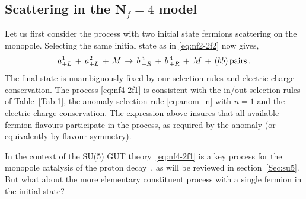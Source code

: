 \documentclass[a4paper,11pt]{article}
\begin{document}
\subsection{Scattering in the $\mathbf N_f=4$ model}
\label{sec:2.3}
\medskip

Let us first consider the process with two initial state fermions scattering on the monopole.  
Selecting the same initial state as in \eqref{eq:nf2-2f2} now gives,
\begin{equation}
\label{eq:nf4-2f1}
 a_{+L}^1 \,+\,a_{+L}^2 \,+\,  M \,\to\, \bar{b}_{\,+R}^{\,3} \,+\, \bar{b}_{\,+R}^{\,4} \,+\,  M \,+\, (\bar{b}b)\,{\rm pairs} \,.
\end{equation} 
The final state is unambiguously fixed by our selection rules and electric charge conservation.  
The process \eqref{eq:nf4-2f1} is consistent with the in/out selection rules of Table~\ref{Tab:1}, the anomaly selection rule \eqref{eq:anom_n} with $n=1$ and the electric charge conservation.
The expression above insures that all available fermion flavours participate in the process, as required by the anomaly (or equivalently by flavour symmetry).

In the context of the SU(5) GUT theory~\eqref{eq:nf4-2f1} is a key process for the monopole catalysis of the proton decay~\cite{Rubakov:1981rg,Callan:1982ah}, as will be reviewed in section~\ref{Sec:su5}. But what about the more elementary constituent process with a single fermion in the initial state?
\end{document}
